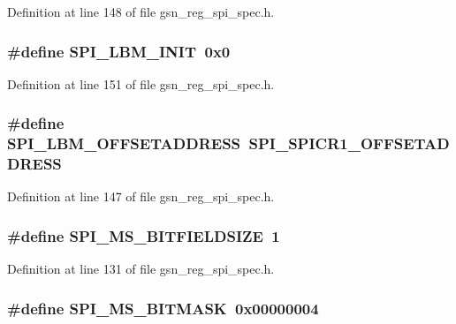 Definition at line 148 of file gsn\_\-reg\_\-spi\_\-spec.h.

\hypertarget{a00573_af3e7b414f3a207c667bf1513bfeeb3cb}{
\subsubsection[{SPI\_\-LBM\_\-INIT}]{\setlength{\rightskip}{0pt plus 5cm}\#define SPI\_\-LBM\_\-INIT~0x0}}
\label{a00573_af3e7b414f3a207c667bf1513bfeeb3cb}


Definition at line 151 of file gsn\_\-reg\_\-spi\_\-spec.h.

\hypertarget{a00573_a2afcc7c11f56ce41ab46be6b456cad04}{
\subsubsection[{SPI\_\-LBM\_\-OFFSETADDRESS}]{\setlength{\rightskip}{0pt plus 5cm}\#define SPI\_\-LBM\_\-OFFSETADDRESS~SPI\_\-SPICR1\_\-OFFSETADDRESS}}
\label{a00573_a2afcc7c11f56ce41ab46be6b456cad04}


Definition at line 147 of file gsn\_\-reg\_\-spi\_\-spec.h.

\hypertarget{a00573_abec5b657176970f3ac47a472672631a3}{
\subsubsection[{SPI\_\-MS\_\-BITFIELDSIZE}]{\setlength{\rightskip}{0pt plus 5cm}\#define SPI\_\-MS\_\-BITFIELDSIZE~1}}
\label{a00573_abec5b657176970f3ac47a472672631a3}


Definition at line 131 of file gsn\_\-reg\_\-spi\_\-spec.h.

\hypertarget{a00573_a75e45a9a2f6e215dd944e87a5be985c3}{
\subsubsection[{SPI\_\-MS\_\-BITMASK}]{\setlength{\rightskip}{0pt plus 5cm}\#define SPI\_\-MS\_\-BITMASK~0x00000004}}
\label{a00573_a75e45a9a2f6e215dd944e87a5be985c3}


